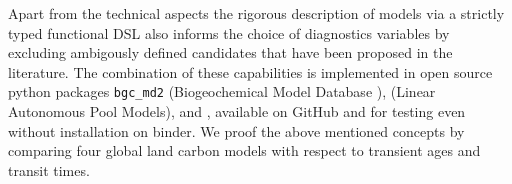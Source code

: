 Apart from the technical aspects the rigorous description of models via a
strictly typed functional DSL also informs the choice of diagnostics variables by
excluding ambigously defined candidates that have been proposed in the literature. 
The combination of these capabilities is implemented in open source python
packages \texttt{bgc\_md2} (Biogeochemical Model Database ), 
\LAPM (Linear Autonomous Pool Models),
\CompartmentalSystems  and \ComputabilityGraphs, available on GitHub and for testing even without installation on binder. 
We proof the above mentioned concepts by comparing four global land carbon models with respect to transient ages and transit times.
